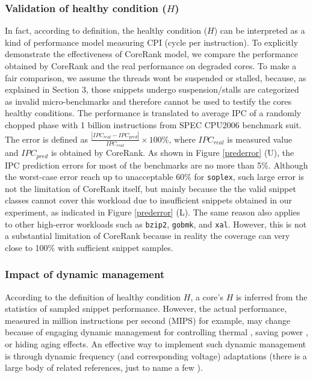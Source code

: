 \subsubsection{Validation of healthy condition ($H$)}
In fact, according to definition, the healthy condition ($H$) can be interpreted as a kind of performance model measuring CPI (cycle per instruction).  To explicitly demonstrate the effectiveness of CoreRank model, we compare the performance obtained by CoreRank and the real performance on degraded cores. To make a fair comparison, we assume the threads wont be suspended or stalled, because, as explained in Section 3, those snippets undergo suspension/stalls are categorized as invalid micro-benchmarks and therefore cannot be used to testify the cores healthy conditions. The performance is translated to average IPC of a randomly chopped  phase with 1 billion instructions from SPEC CPU2006 benchmark suit. The error is defined as $\frac{ |IPC_{real}-IPC_{pred}|}{IPC_{real}}\times 100\%$, where $IPC_{real}$ is  measured value and $IPC_{pred}$ is obtained by CoreRank.  As shown in Figure \ref{prederror} (U),  the IPC prediction errors for most of the benchmarks are no more than 5\%.  Although the worst-case error reach up to unacceptable 60\% for \texttt{soplex}, such large error is not the limitation of CoreRank itself, but mainly because the the valid snippet classes cannot cover this workload due to insufficient snippets obtained in our experiment, as indicated in Figure \ref{prederror} (L).  The same reason also applies to other high-error workloads such as \texttt{bzip2}, \texttt{gobmk}, and \texttt{xal}. However, this is not a substantial limitation of CoreRank because in reality the coverage can very close to 100\% with sufficient snippet samples.  


\subsubsection{Impact of dynamic management}
According to the definition of healthy condition $H$, a core's $H$ is inferred from the statistics of sampled snippet performance. However, the actual performance,  measured in million instructions per second (MIPS) for example, may change because of engaging dynamic management for controlling thermal \cite{ThermalDVFS}, saving power \cite{PackCap}, or hiding aging effects\cite{ReviveNet}. An effective way to implement such dynamic management is through dynamic frequency (and corresponding voltage) adaptations (there is a large body of related references, just to name a few \cite{ReviveNet} \cite{ThermalDVFS}\cite{AgileRegulator}\cite{PackCap}).  

